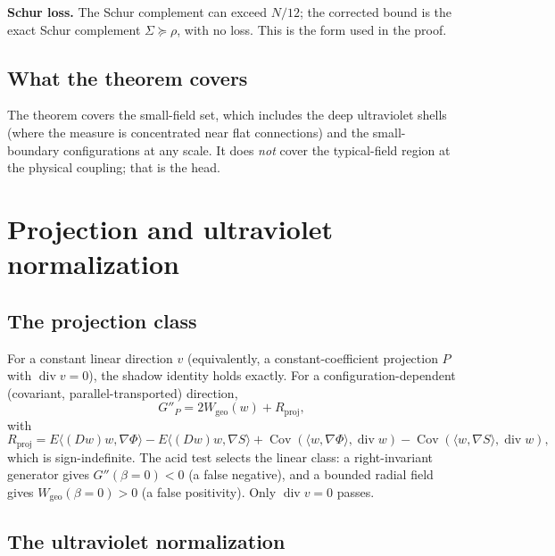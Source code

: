\documentclass[11pt,a4paper]{article}
\begin{document}
\textbf{Schur loss.} The Schur complement can exceed $N/12$; the corrected bound is the exact Schur
complement $\Sigma\succeq\rho$, with no loss. This is the form used in the proof.

\subsection{What the theorem covers}

The theorem covers the small-field set, which includes the deep ultraviolet shells (where the
measure is concentrated near flat connections) and the small-boundary configurations at any scale.
It does \emph{not} cover the typical-field region at the physical coupling; that is the head.

\section{Projection and ultraviolet normalization}
\label{sec:proj}

\subsection{The projection class}

For a constant linear direction $v$ (equivalently, a constant-coefficient projection $P$ with
$\operatorname{div}v=0$), the shadow identity holds exactly. For a configuration-dependent
(covariant, parallel-transported) direction,
\begin{equation}
G''_P=2W_{\mathrm{geo}}(w)+R_{\mathrm{proj}},
\label{eq:proj}
\end{equation}
with
\begin{equation}
R_{\mathrm{proj}}=E\langle (Dw)w,\nabla\Phi\rangle-E\langle (Dw)w,\nabla S\rangle
+\operatorname{Cov}(\langle w,\nabla\Phi\rangle,\operatorname{div}w)
-\operatorname{Cov}(\langle w,\nabla S\rangle,\operatorname{div}w),
\label{eq:Rproj}
\end{equation}
which is sign-indefinite. The acid test selects the linear class: a right-invariant generator gives
$G''(\beta=0)<0$ (a false negative), and a bounded radial field gives $W_{\mathrm{geo}}(\beta=0)>0$
(a false positivity). Only $\operatorname{div}v=0$ passes.

\subsection{The ultraviolet normalization}
\end{document}

